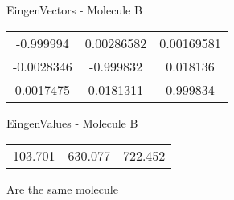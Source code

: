 \begin{multicols}{2}
\begin{center}
\vtab
 EingenVectors - Molecule B     \\
\vtab
\begin{tabular}{|c c c|}
-0.999994	 & 	0.00286582	 & 	0.00169581	 \\
-0.0028346	 & 	-0.999832	 & 	0.018136	 \\
0.0017475	 & 	0.0181311	 & 	0.999834
\end{tabular}

\vtab
 EingenValues - Molecule B     \\
\vtab
\begin{tabular}{|c c c|}
103.701	 & 	630.077	 & 	722.452
\end{tabular}

\end{center}
\end{multicols}
\begin{center}
\vtab
\vtab
\textcolor{NavyBlue}{\Large Are the same molecule}
\end{center}
\newpage

